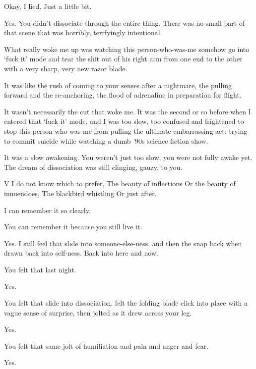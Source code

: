 Okay, I lied. Just a little bit.

\begin{ally}
Yes. You didn't dissociate through the entire thing. There was no small part of that scene that was horribly, terrfyingly intentional.
\end{ally}
What really woke me up was watching this person-who-was-me somehow go into `fuck it' mode and tear the shit out of his right arm from one end to the other with a very sharp, very new razor blade.

It was like the rush of coming to your senses after a nightmare, the pulling forward and the re-anchoring, the flood of adrenaline in preparation for flight.

It wasn't necessarily the cut that woke me. It was the second or so before when I entered that `fuck it' mode, and I was too slow, too confused and frightened to stop this person-who-was-me from pulling the ultimate embarrassing act: trying to commit suicide while watching a dumb '90s science fiction show.

\begin{ally}
It was a slow awakening. You weren't just too slow, you were not fully awake yet. The dream of dissociation was still clinging, gauzy, to you.
\end{ally}
V I do not know which to prefer, The beauty of inflections Or the beauty of innuendoes, The blackbird whistling Or just after.

I can remember it so clearly.

\begin{ally}
You can remember it because you still live it.
\end{ally}
Yes. I still feel that slide into someone-else-ness, and then the snap back when drawn back into self-ness. Back into here and now.

\begin{ally}
You felt that last night.
\end{ally}
Yes.

\begin{ally}
You felt that slide into dissociation, felt the folding blade click into place with a vague sense of surprise, then jolted as it drew across your leg.
\end{ally}
Yes.

\begin{ally}
You felt that same jolt of humiliation and pain and anger and fear.
\end{ally}
Yes.

